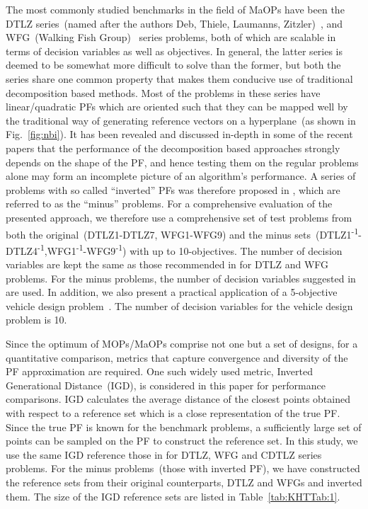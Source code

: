 \documentclass[twocolumn,10pt]{asme2ej}
\begin{document}
The most commonly studied benchmarks in the field of MaOPs have been the DTLZ series~(named after the authors Deb, Thiele, Laumanns, Zitzler)~\cite{KHTdeb2005scalable}, and WFG~(Walking Fish Group)~\cite{KHTwfg2006huband} series problems, both of which are scalable in terms of decision variables as well as objectives. In general, the latter series is deemed to be somewhat more difficult to solve than the former, but both the series share one common property that makes them conducive use of traditional decomposition based methods. Most of the problems in these series have linear/quadratic PFs which are oriented such that they can be mapped well by the traditional way of generating reference vectors on a hyperplane~(as shown in Fig.~\ref{fig:nbi}). It has been revealed and discussed in-depth in some of the recent papers\cite{asaf2017enhanced,KHTishibuchi2016inverse} that the performance of the decomposition based approaches strongly depends on the shape of the PF, and hence testing them on the regular problems alone may form an incomplete picture of an algorithm's performance. A series of problems with so called ``inverted'' PFs was therefore proposed in  \cite{KHTishibuchi2016inverse}, which are referred to as the ``minus'' problems. For a comprehensive evaluation of the presented approach, we therefore use a comprehensive set of test problems from both the original~(DTLZ1-DTLZ7, WFG1-WFG9) and the minus sets~(DTLZ1\textsuperscript{-1}-DTLZ4\textsuperscript{-1},WFG1\textsuperscript{-1}-WFG9\textsuperscript{-1}) with up to 10-objectives. The number of decision variables are kept the same as those recommended in \cite{KHTchugh2016krvea} for DTLZ and WFG problems. For the minus problems, the number of decision variables suggested in \cite{KHTishibuchi2016inverse} are used.  In addition, we also present a practical application of a 5-objective vehicle design problem~\cite{KHTbarnum2010car}. The number of decision variables for the vehicle design problem is 10.

Since the optimum of MOPs/MaOPs comprise not one but a set of designs, for a quantitative comparison, metrics that capture convergence and diversity of the PF approximation are required. One such widely used metric, Inverted Generational Distance~(IGD), is considered in this paper for performance comparisons. IGD calculates the average distance of the closest points obtained with respect to a reference set which is a close representation of the true PF. Since the true PF is known for the benchmark problems, a sufficiently large set of points can be sampled on the PF to construct the reference set. In this study, we use the same IGD reference those in \cite{KHTchugh2016krvea,KHTchugh2016const} for DTLZ, WFG and CDTLZ series problems. For the minus problems~(those with inverted PF), we have constructed the reference sets from their original counterparts, DTLZ and WFGs and inverted them. The size of the IGD reference sets are listed in Table~\ref{tab:KHTTab:1}. 
\end{document}
